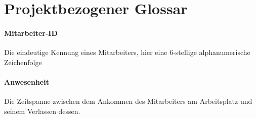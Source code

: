 \section{Projektbezogener Glossar}
\paragraph{Mitarbeiter-ID} Die eindeutige Kennung eines Mitarbeiters, hier eine 6-stellige alphanumerische Zeichenfolge

\paragraph{Anwesenheit} Die Zeitspanne zwischen dem Ankommen des Mitarbeiters am Arbeitsplatz und seinem Verlassen dessen.







